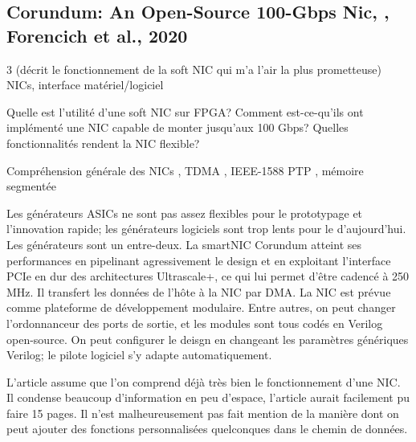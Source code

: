 
\subsection{Corundum: An Open-Source 100-Gbps Nic, \cite{forencich_corundum_2020}, Forencich et al., 2020}

 3 (décrit le fonctionnement de la soft NIC qui m'a l'air la plus prometteuse)
 NICs, interface matériel/logiciel

 Quelle est l'utilité d'une soft NIC sur FPGA? Comment est-ce-qu'ils ont implémenté une NIC capable de monter jusqu'aux 100 Gbps? Quelles fonctionnalités rendent la NIC flexible?

 Compréhension générale des NICs \cite{patterson_computer_2017}, TDMA \cite{noauthor_time-division_2022}, IEEE-1588 PTP \cite{noauthor_precision_2023}, mémoire segmentée \cite{noauthor_memory_2023}

 Les générateurs ASICs ne sont pas assez flexibles pour le prototypage et l'innovation rapide; les générateurs logiciels sont trop lents pour le  d'aujourd'hui. Les générateurs sont un entre-deux. La smartNIC Corundum atteint ses performances en  pipelinant agressivement le design et en exploitant l'interface PCIe en dur des architectures Ultrascale+, ce qui lui permet d'être cadencé à 250 MHz. Il transfert les données de l'hôte à la NIC par DMA.
La NIC est prévue comme plateforme de développement modulaire. Entre autres, on peut changer l'ordonnanceur des ports de sortie, et les modules sont tous codés en Verilog open-source. On peut configurer le deisgn en changeant les paramètres génériques Verilog; le pilote logiciel s'y adapte automatiquement.



 L'article assume que l'on comprend déjà très bien le fonctionnement d'une NIC. Il condense beaucoup d'information en peu d'espace, l'article aurait facilement pu faire 15 pages. Il n'est malheureusement pas fait mention de la manière dont on peut ajouter des fonctions personnalisées quelconques dans le chemin de données.

\clearpage
